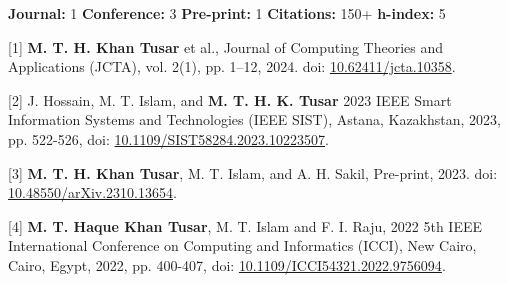 

{{\fontsize{9pt}{11pt}\selectfont\bodyfont\color{graytext}
\textbf{Journal:} 1 \enskip
\textbf{Conference:} 3 \enskip
\textbf{Pre-print:} 1 \enskip
\textbf{Citations:} 150+ \enskip
\textbf{h-index:} 5 

}}

\vspace{0.4em}


{{\fontsize{9pt}{11pt}\selectfont\bodyfont\color{graytext}



[1] \textbf{M. T. H. Khan Tusar} et al., 
Journal of Computing Theories and Applications (JCTA), vol. 2(1), pp. 1–12, 2024.
doi: \href{https://dx.doi.org/10.62411/jcta.10358}{\textcolor{Cerulean}{10.62411/jcta.10358}}.


[2] J. Hossain, M. T. Islam, and \textbf{M. T. H. K. Tusar}  2023 IEEE Smart Information Systems and Technologies (IEEE SIST), Astana, Kazakhstan, 2023, pp. 522-526, doi: \href{https://doi.org/10.1109/SIST58284.2023.10223507}{\textcolor{Cerulean}{10.1109/SIST58284.2023.10223507}}.


[3] \textbf{M. T. H. Khan Tusar}, M. T. Islam, and A. H. Sakil,  Pre-print, 2023.
doi: \href{https://doi.org/10.48550/arXiv.2310.13654}{\textcolor{Cerulean}{10.48550/arXiv.2310.13654}}.


[4] \textbf{M. T. Haque Khan Tusar}, M. T. Islam and F. I. Raju,  2022 5th IEEE International Conference on Computing and Informatics (ICCI), New Cairo, Cairo, Egypt, 2022, pp. 400-407, doi: \href{https://www.doi.org/10.1109/ICCI54321.2022.9756094}{\textcolor{Cerulean}{10.1109/ICCI54321.2022.9756094}}.

}}
